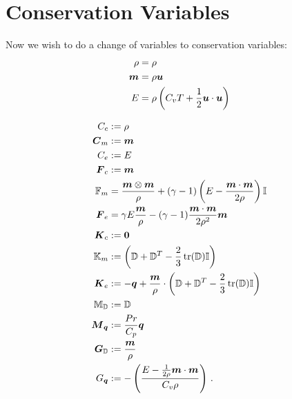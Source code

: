 \documentclass[Dissertation.tex]{subfiles}
\begin{document}
\section{Conservation Variables}
Now we wish to do a change of variables to conservation variables: 
\begin{align*}
\rho&=\rho\\
\boldsymbol m&=\rho\boldsymbol u\\
E&=\rho\left( C_v T+\frac{1}{2}\boldsymbol u\cdot\boldsymbol u \right)
\end{align*}

\begin{align*}
C_c&:=\rho\\
\boldsymbol C_m&:=\boldsymbol m\\
C_e&:=E\\
\boldsymbol F_c&:=\boldsymbol m\\
\mathbb{F}_m&=\frac{\boldsymbol m\otimes\boldsymbol m}{\rho}+(\gamma-1)\left( E-\frac{\boldsymbol m\cdot\boldsymbol m}{2\rho} \right)\mathbb{I}\\
\boldsymbol F_e&=\gamma E\frac{\boldsymbol m}{\rho}-(\gamma-1)\frac{\boldsymbol m\cdot\boldsymbol m}{2\rho^2}\boldsymbol m\\
\boldsymbol K_c&:=\boldsymbol 0\\
\mathbb{K}_m&:=\left( \mathbb{D}+\mathbb{D}^T-\frac{2}{3}\operatorname*{tr}(\mathbb{D})\mathbb{I} \right)\\
\boldsymbol K_e&:=-\boldsymbol q+\frac{\boldsymbol m}{\rho}\cdot\left( \mathbb{D}+\mathbb{D}^T-\frac{2}{3}\operatorname*{tr}(\mathbb{D})\mathbb{I} \right)\\
\mathbb{M}_{\mathbb{D}}&:=\mathbb{D}\\
\boldsymbol M_{\boldsymbol q}&:=\frac{Pr}{C_p}\boldsymbol q\\
\boldsymbol G_{\mathbb{D}}&:=\frac{\boldsymbol m}{\rho}\\
G_{\boldsymbol q}&:=-\left( \frac{E-\frac{1}{2\rho}\boldsymbol m\cdot\boldsymbol m}{C_v\rho} \right)\,.
\end{align*}
\end{document}

